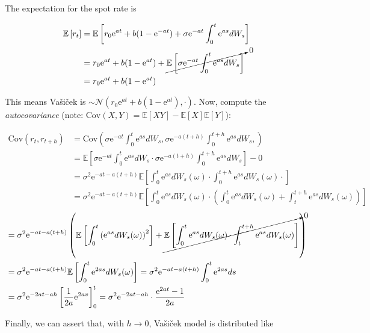 \documentclass[oneside,titlepage,headinclude,12pt,a4paper,BCOR5mm,footinclude]{book}
\theoremstyle{defn}
\newcommand{\eexp}{\mathrm{e}}
\newcommand\NN{\mathcal{N}}
\begin{document}
The expectation for the spot rate is 

\begin{align*}
  \mathbb{E}\left[ r_t \right] &= \mathbb{E}\left[r_0 \eexp^{at}+b(1-\eexp^{-at}) + \sigma \eexp^{-at}\int_0^t\eexp^{as}dW_s\right]
  \\ &= r_0 \eexp^{at} + b(1-\eexp^{at}) + \cancelto{0}{\mathbb{E}\left[\sigma \eexp^{-at}\int_0^t\eexp^{as}dW_s\right]}
  \\ &= r_0 \eexp^{at} + b(1-\eexp^{at}) 
\end{align*}

This  means Va\v{s}i\v{c}ek  is  $\sim \NN(r_0  \eexp^{at}  + b(1-\eexp^{at})  ,
\cdot)$. Now,  compute the  \textit{autocovariance} (note:  $\mathrm{Cov}(X,Y) =
\mathbb{E}[XY] - \mathbb{E}[X]\mathbb{E}[Y]$):

\begin{align*}
  \mathrm{Cov}(r_t,r_{t+h}) &= \mathrm{Cov}\left(
    \sigma \eexp^{-at}\int_0^t\eexp^{as}dW_s,
    \sigma \eexp^{-a(t+h)}\int_0^{t+h}\eexp^{as}dW_s,
  \right)
  \\ &= \mathbb{E}\left[ 
    \sigma\eexp^{-at}\int_0^t\eexp^{as}dW_s \cdot
    \sigma\eexp^{-a(t+h)}\int_0^{t+h}\eexp^{as}dW_s
  \right] - 0
  \\ &= \sigma^2 \eexp^{-at-a(t+h)} \mathbb{E}\left[
    \int_0^t\eexp^{as}dW_s(\omega) \cdot
    \int_0^{t+h}\eexp^{as}dW_s(\omega) \cdot
  \right]
  \\ &= \sigma^2 \eexp^{-at-a(t+h)} \mathbb{E}\left[
    \int_0^t\eexp^{as}dW_s(\omega) \cdot \left(
      \int_0^{t}\eexp^{as}dW_s(\omega) +
      \int_t^{t+h}\eexp^{as}dW_s(\omega)
    \right)
  \right]
\end{align*}
\begin{align*}
  &= \sigma^2 \eexp^{-at-a(t+h)} \left(\mathbb{E}\left[
      \int_0^t \left(\eexp^{as}dW_s(\omega)\right)^2 
    \right] + \cancelto{0}{\mathbb{E}\left[
      \int_0^{t}\eexp^{as}dW_s(\omega) \cdot
      \int_t^{t+h}\eexp^{as}dW_s(\omega)
    \right]}
  \right)
  \\ &= \sigma^2 \eexp^{-at-a(t+h)} \mathbb{E}\left[
    \int_0^t \eexp^{2as}dW_s(\omega)
  \right] 
  = \sigma^2 \eexp^{-at-a(t+h)} \int_0^t \eexp^{2as}ds
  \\ &= \sigma^2 \eexp^{-2at-ah} \left[\frac{1}{2a}\eexp^{2av}\right]^t_0
  = \sigma^2\eexp^{-2at-ah} \cdot\frac{\eexp^{2at}-1}{2a}
\end{align*}

Finally,  we  can  assert  that,  with  $h  \to  0$,  Va\v{s}i\v{c}ek  model  is
distributed like
\end{document}
